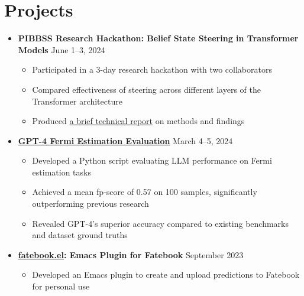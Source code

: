 \documentclass[letterpaper, 9pt]{article}
\begin{document}
\section*{Projects}
  \begin{itemize}
    \item \textbf{PIBBSS Research Hackathon: Belief State Steering in Transformer Models} \hfill June 1--3, 2024
    \begin{itemize}
        \item Participated in a 3-day research hackathon with two collaborators
        \item Compared effectiveness of steering across  different layers of the Transformer architecture
        \item Produced \href{https://github.com/sonofhypnos/CV/blob/main/steering-models-belief-states.pdf}{a brief technical report} on methods and findings
    \end{itemize}
    \item \textbf{\href{https://github.com/sonofhypnos/fermi}{GPT-4 Fermi Estimation Evaluation}} \hfill March 4--5, 2024
    \begin{itemize}
      \item Developed a Python script evaluating LLM performance on Fermi estimation tasks
      \item Achieved a mean fp-score of 0.57 on 100 samples, significantly outperforming previous research
      \item Revealed GPT-4's superior accuracy compared to existing benchmarks and dataset ground truths
    \end{itemize}
    \item \textbf{\href{https://github.com/sonofhypnos/fatebook.el}{fatebook.el}: Emacs Plugin for Fatebook} \hfill September 2023
    \begin{itemize}
        \item Developed an Emacs plugin to create and upload predictions to Fatebook for personal use
    \end{itemize}


\end{itemize}
\end{document}
